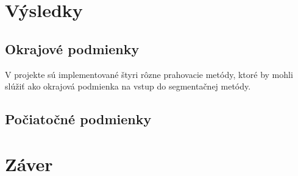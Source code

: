 \documentclass[a4paper,11pt,twoside]{article}%
\begin{document}
\begin{figure}[h!]%
    \centering
    \qquad
    \label{fig:uidata1}%
\end{figure}

 


\newpage
\section{Výsledky}
\subsection{Okrajové podmienky}

V projekte sú implementované štyri rôzne prahovacie metódy, ktoré by mohli slúžiť ako okrajová podmienka na vstup do segmentačnej metódy.

\subsection{Počiatočné podmienky}

\newpage
\section{Záver}


\newpage
\begin{thebibliography}{50}
\end{thebibliography}
\end{document}
